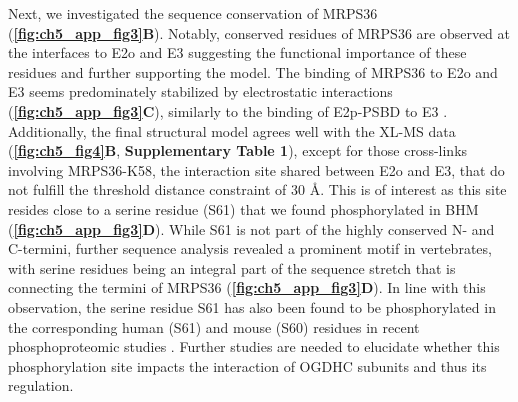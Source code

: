 Next, we investigated the sequence conservation of MRPS36 (\textbf{\autoref{fig:ch5_app_fig3}B}). Notably, conserved residues of MRPS36 are observed at the interfaces to E2o and E3 suggesting the functional importance of these residues and further supporting the model. The binding of MRPS36 to E2o and E3 seems predominately stabilized by electrostatic interactions (\textbf{\autoref{fig:ch5_app_fig3}C}), similarly to the binding of E2p-PSBD to E3 \cite{Mande_1996}. Additionally, the final structural model agrees well with the XL-MS data (\textbf{\autoref{fig:ch5_fig4}B}, \textbf{Supplementary Table 1}), except for those cross-links involving MRPS36-K58, the interaction site shared between E2o and E3, that do not fulfill the threshold distance constraint of 30 Å. This is of interest as this site resides close to a serine residue (S61) that we found phosphorylated in BHM (\textbf{\autoref{fig:ch5_app_fig3}D}). While S61 is not part of the highly conserved N- and C-termini, further sequence analysis revealed a prominent motif in vertebrates, with serine residues being an integral part of the sequence stretch that is connecting the termini of MRPS36 (\textbf{\autoref{fig:ch5_app_fig3}D}). In line with this observation, the serine residue S61 has also been found to be phosphorylated in the corresponding human (S61) and mouse (S60) residues in recent phosphoproteomic studies \cite{Mertins_2016, Sharma_2014, Wilson-Grady_2013}. Further studies are needed to elucidate whether this phosphorylation site impacts the interaction of OGDHC subunits and thus its regulation.

